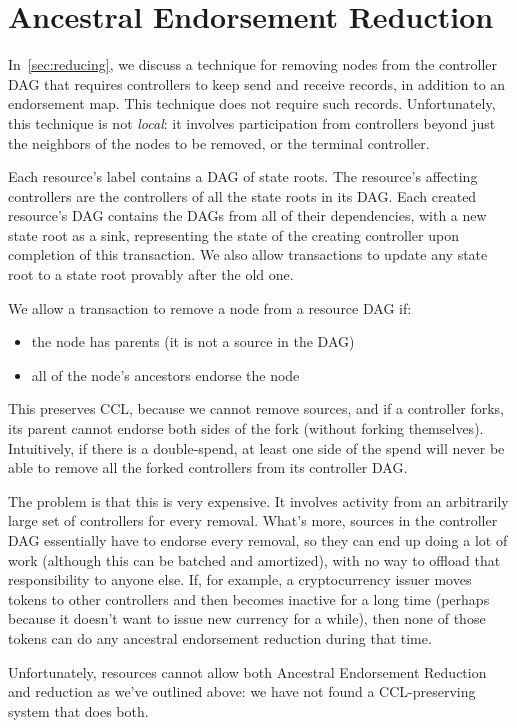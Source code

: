\documentclass[a4paper,USenglish,cleveref, autoref, thm-restate, anonymous]{lipics-v2021}
\begin{document}
\section{Ancestral Endorsement Reduction}
\label{sec:ancestral}
In~\cref{sec:reducing}, we discuss a technique for removing nodes from the controller DAG that requires controllers to keep send and receive records, in addition to an endorsement map. 
This technique does not require such records.
Unfortunately, this technique is not \emph{local}: it involves participation from controllers beyond just the neighbors of the nodes to be removed, or the terminal controller.

Each resource's label contains a DAG of state roots.
The resource's affecting controllers are the controllers of all the state roots in its DAG.
Each created resource's DAG contains the DAGs from all of their dependencies, with a new state root as a sink, representing the state of the creating controller upon completion of this transaction. 
We also allow transactions to update any state root to a state root provably after the old one. 

We allow a transaction to remove a node from a resource DAG if:
\begin{itemize}
    \item the node has parents (it is not a source in the DAG)
    \item all of the node's ancestors endorse the node
\end{itemize}
This preserves CCL, because we cannot remove sources, and if a controller forks, its parent cannot endorse both sides of the fork (without forking themselves). 
Intuitively, if there is a double-spend, at least one side of the spend will never be able to remove all the forked controllers from its controller DAG. 

The problem is that this is very expensive. 
It involves activity from an arbitrarily large set of controllers for every removal. 
What's more, sources in the controller DAG essentially have to endorse every removal, so they can end up doing a lot of work (although this can be batched and amortized), with no way to offload that responsibility to anyone else. 
If, for example, a cryptocurrency issuer moves tokens to other controllers and then becomes inactive for a long time (perhaps because it doesn't want to issue new currency for a while), then none of those tokens can do any ancestral endorsement reduction during that time.

Unfortunately, resources cannot allow both Ancestral Endorsement Reduction and reduction as we've outlined above: we have not found a CCL-preserving system that does both.
\end{document}
